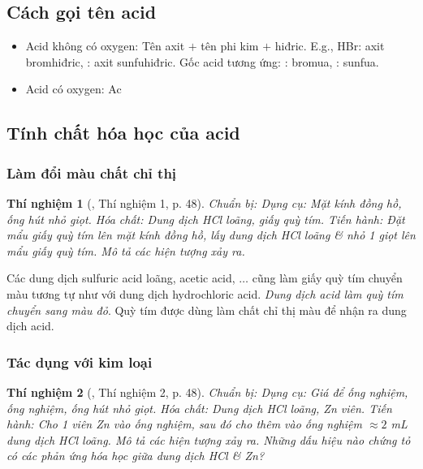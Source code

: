 \documentclass{article}
\newtheorem{thinghiem}{Thí nghiệm}
\begin{document}
\subsection{Cách gọi tên acid}

\begin{itemize}
	\item Acid không có oxygen: Tên axit $+$ tên phi kim $+$ hiđric. E.g., HBr: axit bromhiđric, : axit sunfuhiđric. Gốc acid tương ứng: : bromua, : sunfua.
	\item Acid có oxygen: Ac
\end{itemize}

\subsection{Tính chất hóa học của acid}

\subsubsection{Làm đổi màu chất chỉ thị}

\begin{thinghiem}[\cite{SGK_KHTN_8_Canh_Dieu}, Thí nghiệm 1, p. 48]
	{\rm Chuẩn bị:} Dụng cụ: Mặt kính đồng hồ, ống hút nhỏ giọt. Hóa chất: Dung dịch {\rm HCl} loãng, giấy quỳ tím. {\rm Tiến hành:} Đặt mẩu giấy quỳ tím lên mặt kính đồng hồ, lấy dung dịch {\rm HCl} loãng \& nhỏ 1 giọt lên mẩu giấy quỳ tím. Mô tả các hiện tượng xảy ra.
\end{thinghiem}
Các dung dịch sulfuric acid loãng, acetic acid, $\ldots$ cũng làm giấy quỳ tím chuyển màu tương tự như với dung dịch hydrochloric acid. \textit{Dung dịch acid làm quỳ tím chuyển sang màu đỏ}. Quỳ tím được dùng làm chất chỉ thị màu để nhận ra dung dịch acid. 

\subsubsection{Tác dụng với kim loại}

\begin{thinghiem}[\cite{SGK_KHTN_8_Canh_Dieu}, Thí nghiệm 2, p. 48]
	{\rm Chuẩn bị:} Dụng cụ: Giá để ống nghiệm, ống nghiệm, ống hút nhỏ giọt. Hóa chất: Dung dịch {\rm HCl} loãng, {\rm Zn} viên. {\rm Tiến hành:} Cho 1 viên {\rm Zn} vào ống nghiệm, sau đó cho thêm vào ống nghiệm $\approx 2$ {\rm mL} dung dịch {\rm HCl} loãng. Mô tả các hiện tượng xảy ra. Những dấu hiệu nào chứng tỏ có các phản ứng hóa học giữa dung dịch {\rm HCl} \& {\rm Zn}?
\end{thinghiem}
\end{document}
